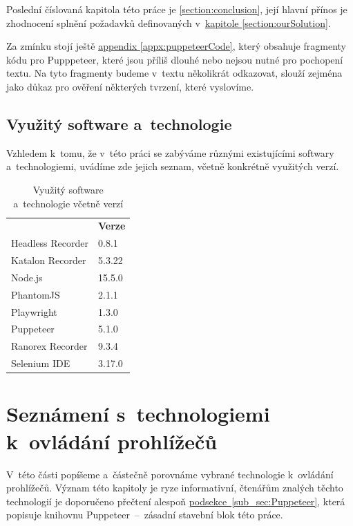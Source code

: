 \documentclass[12pt, a4paper, twoside]{article}
\newcommand{\refAddedText}[3]{\hyperref[#1]{#2\ref{#1}#3}}
\newcommand*{\fullNameref}[1]{\hyperref[{#1}]{\ref{#1}~\nameref{#1}}}
\begin{document}
	Poslední číslovaná kapitola této práce je \cref{section:conclusion}, její hlavní přínos je zhodnocení splnění požadavků definovaných v~\hyperref[section:ourSolution]{kapitole \ref{section:ourSolution}}.
	
	Za zmínku stojí ještě \hyperref[appx:puppeteerCode]{appendix \ref{appx:puppeteerCode}}, který obsahuje fragmenty kódu pro Pupppeteer, které jsou příliš dlouhé nebo nejsou nutné pro pochopení textu. Na tyto fragmenty budeme v~textu několikrát odkazovat, slouží zejména jako důkaz pro ověření některých tvrzení, které vyslovíme.
	
	\subsection{Využitý software a~technologie}
	Vzhledem k~tomu, že v~této práci se zabýváme různými existujícími softwary a~technologiemi, uvádíme zde jejich seznam, včetně konkrétně využitých verzí.
	\begin{table}[H]
	\centering
	\begin{tabular}{ l|l } 
		\rowcolor{tableHeadingBackground}
		\multicolumn{1}{l}{\textbf{Název}} & \multicolumn{1}{l}{\textbf{Verze}} \\
		Headless Recorder & 0.8.1 \\ 
		Katalon Recorder & 5.3.22 \\ 
		Node.js & 15.5.0\\
		PhantomJS & 2.1.1 \\
		Playwright & 1.3.0  \\
		Puppeteer & 5.1.0 \\
		Ranorex Recorder & 9.3.4 \\
		Selenium IDE & 3.17.0 \\
	\end{tabular}
	\caption{Využitý software a~technologie včetně verzí}
\end{table}
	\section{Seznámení s~technologiemi k~ovládání prohlížečů}
	\label{section:introToBrowserAut}
	V~této části popíšeme a~částečně porovnáme vybrané technologie k~ovládání prohlížečů. Význam této kapitoly je ryze informativní, čtenářům znalých těchto technologií je doporučeno přečtení alespoň \refAddedText{sub_sec:Puppeteer}{podsekce~}{}, která popisuje knihovnu Puppeteer~--~zásadní stavební blok této práce.
\end{document}
